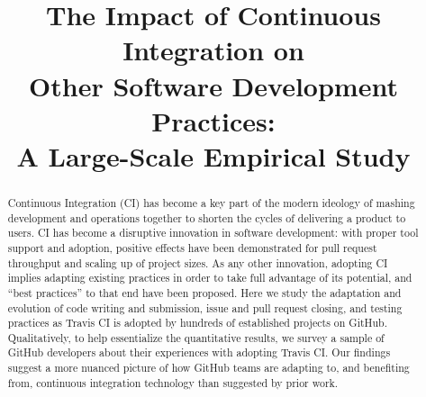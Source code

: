 \documentclass[10pt,conference]{IEEEtran}
\newcommand{\GH}{{\sc GitHub}\xspace}
\newcommand{\Tvis}{{\sc Travis CI}\xspace}
\newcommand\blfootnote[1]{%
  \begingroup
  \renewcommand\thefootnote{}\footnote{#1}%
  \addtocounter{footnote}{-1}%
  \endgroup
}
\begin{document}
\title{The Impact of Continuous Integration on \\Other Software 
Development Practices: \\A Large-Scale Empirical Study}


\maketitle
\begin{abstract}
Continuous Integration (CI)
has become a key part of the modern ideology 
of mashing development and operations together to shorten the cycles of 
delivering a product to users. 
CI has become a disruptive innovation in software development: with proper 
tool support and adoption, positive effects have been demonstrated for pull 
request throughput and scaling up of project sizes. 
As any other innovation, adopting CI implies adapting existing practices in 
order to take full advantage of its potential, and ``best practices'' to that end 
have been proposed. 
Here we study the adaptation and evolution of code writing and submission,
issue and pull request closing, and testing practices as \Tvis is adopted by 
hundreds of established projects on \GH. 
Qualitatively, to help essentialize the quantitative results, we survey a 
sample of \GH developers about their experiences with adopting \Tvis. 
Our findings suggest a more nuanced picture of how \GH teams are adapting to, and
benefiting from, continuous integration technology than suggested by prior
work.
\end{abstract}







%





\balance

\newpage


\end{document}
